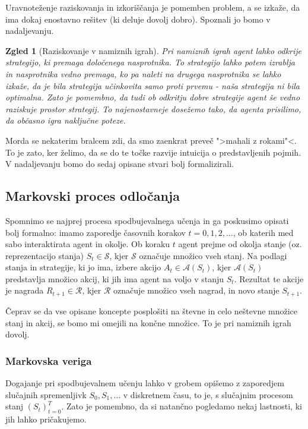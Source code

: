 \documentclass[12pt,a4paper]{amsart}
\theoremstyle{definition} %
\theoremstyle{plain} %
\newtheorem{zgled}[definicija]{Zgled}
\begin{document}
Uravnoteženje raziskovanja in izkoriščanja je pomemben problem, a se izkaže, da ima dokaj enostavno
rešitev (ki deluje dovolj dobro). Spoznali jo bomo v nadaljevanju.

\begin{zgled}[Raziskovanje v namiznih igrah]
    Pri namiznih igrah agent lahko odkrije strategijo, ki premaga določenega nasprotnika. To strategijo
    lahko potem izrablja in nasprotnika vedno premaga, ko pa naleti na drugega nasprotnika se lahko izkaže, 
    da je bila strategija učinkovita samo proti prvemu - naša strategija ni bila optimalna. Zato je 
    pomembno, da tudi ob odkritju dobre strategije agent še vedno raziskuje prostor strategij. To 
    najenostavneje dosežemo tako, da agenta prisilimo, da občasno igra naključne poteze.
\end{zgled}

Morda se nekaterim bralcem zdi, da smo zaenkrat preveč ">mahali z rokami"<. To je zato, ker želimo, 
da se do te točke razvije intuicija o predstavljenih pojmih. V nadaljevanju bomo do sedaj opisane 
stvari bolj formalizirali.


\subsection{Markovski proces odločanja}
Spomnimo se najprej procesa spodbujevalnega učenja in ga poskusimo opisati bolj formalno: 
imamo zaporedje časovnih korakov $t = 0, 1, 2, \dots$, ob katerih med sabo interaktirata agent 
in okolje. Ob koraku $t$ agent prejme od okolja stanje (oz. reprezentacijo stanja) $S_t \in 
\mathcal{S}$, kjer $\mathcal{S}$ označuje množico vseh stanj. Na podlagi stanja in strategije, 
ki jo ima, izbere akcijo $A_t \in \mathcal{A}(S_t)$, kjer $\mathcal{A}(S_t)$ predstavlja 
množico akcij, ki jih ima agent na voljo v stanju $S_t$. Rezultat te akcije je nagrada $R_{t+1} 
\in \mathcal{R}$, kjer $\mathcal{R}$ označuje množico vseh nagrad, in novo stanje $S_{t+1}$.

Čeprav se da vse opisane koncepte posplošiti na števne in celo neštevne množice stanj in akcij, 
se bomo mi omejili na končne množice. To je pri namiznih igrah dovolj.

\subsubsection{Markovska veriga}
Dogajanje pri spodbujevalnem učenju lahko v grobem opišemo z zaporedjem slučajnih spremenljivk $S_0,
S_1, \dots$ v diskretnem času, to je, s slučajnim procesom stanj $(S_t)_{t=0}^T$. Zato je pomembno, 
da si natančno pogledamo nekaj lastnosti, ki jih lahko pričakujemo. 
\end{document}
